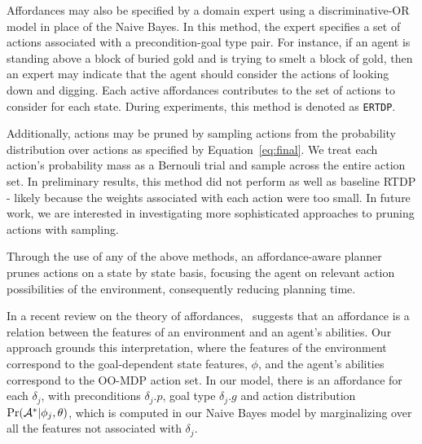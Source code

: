 \documentclass[letterpaper]{article}
\begin{document}
Affordances may also be specified by a domain expert using a discriminative-OR model in place of the Naive Bayes. In this method, the expert specifies a set of actions associated with a precondition-goal type pair. For instance, if an agent is standing above a block of buried gold and is trying to smelt a block of gold, then an expert may indicate that the agent should consider the actions of looking down and digging. Each active affordances contributes to the set of actions to consider for each state. During experiments, this method is denoted as \texttt{ERTDP}.

Additionally, actions may be pruned by sampling actions from the probability distribution over actions as specified by Equation~\ref{eq:final}. We treat each action's probability mass as a Bernouli trial and sample across the entire action set. In preliminary results, this method did not perform as well as baseline RTDP - likely because the weights associated with each action were too small. In future work, we are interested in investigating more sophisticated approaches to pruning actions with sampling. 

Through the use of any of the above methods, an affordance-aware planner prunes actions
on a state by state basis, focusing the agent on relevant action possibilities of the environment,
consequently reducing planning time.

In a recent review on the theory of affordances,~\citet{chemero2003} suggests that an affordance
is a relation between the features of an environment and an agent's abilities. Our approach
grounds this interpretation, where the features of the environment correspond to the goal-dependent
state features, $\phi$, and the agent's abilities correspond to the OO-MDP action set. In our model,
there is an affordance for each $\delta_j$, with preconditions $\delta_j.p$, goal type $\delta_j.g$ and
action distribution $\Pr({\cal A}^* | \phi_j, \theta)$, which is computed in our Naive Bayes model by
marginalizing over all the features not associated with $\delta_j$.
  
\end{document}
